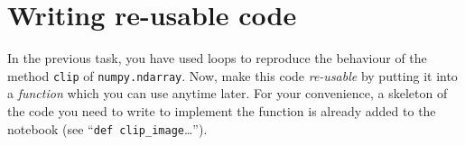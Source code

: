 \documentclass[12pt,a4paper]{article}
\begin{document}
\section{Writing re-usable code \bonustask}
\label{task:functions}
In the previous task, you have used loops to reproduce the behaviour of the method \texttt{clip} of \texttt{numpy.ndarray}. Now, make this code \emph{re-usable} by putting it into a \emph{function} which you can use anytime later. For your convenience, a skeleton of the code you need to write to implement the function is already added to the notebook (see ``\texttt{def clip\_image}\ldots'').
\end{document}
